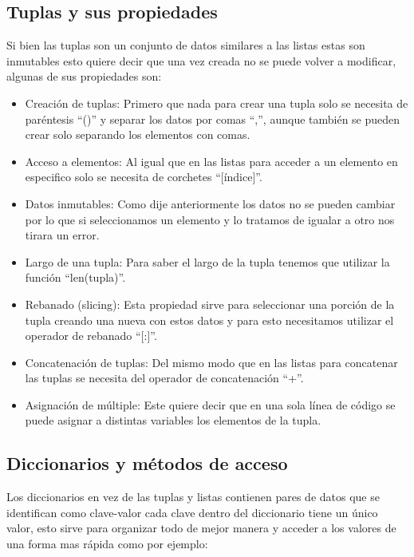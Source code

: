 \subsection{Tuplas y sus propiedades}
Si bien las tuplas son un conjunto de datos similares a las listas estas son inmutables esto quiere decir que una vez creada no se puede volver a modificar, algunas de sus propiedades son:

\begin{itemize}
    \item Creación de tuplas: Primero que nada para crear una tupla solo se necesita de paréntesis ``()'' y separar los datos por comas ``,'', aunque también se pueden crear solo separando los elementos con comas.
    \item Acceso a elementos: Al igual que en las listas para acceder a un elemento en especifico solo se necesita de corchetes ``[índice]''.
    \item Datos inmutables: Como dije anteriormente los datos no se pueden cambiar por lo que si seleccionamos un elemento y lo tratamos de igualar a otro nos tirara un error.
    \item Largo de una tupla: Para saber el largo de la tupla tenemos que utilizar la función ``len(tupla)''.
    \item Rebanado (slicing): Esta propiedad sirve para seleccionar una porción de la tupla creando una nueva con estos datos y para esto necesitamos utilizar el operador de rebanado ``[:]''.
    \item Concatenación de tuplas: Del mismo modo que en las listas para concatenar las tuplas se necesita del operador de concatenación ``+''.
    \item Asignación de múltiple: Este quiere decir que en una sola línea de código se puede asignar a distintas variables los elementos de la tupla. 
\end{itemize}

\subsection{Diccionarios y métodos de acceso}
Los diccionarios en vez de las tuplas y listas contienen pares de datos que se identifican como clave-valor cada clave dentro del diccionario tiene un único valor, esto sirve para organizar todo de mejor manera y acceder a los valores de una forma mas rápida como por ejemplo:

